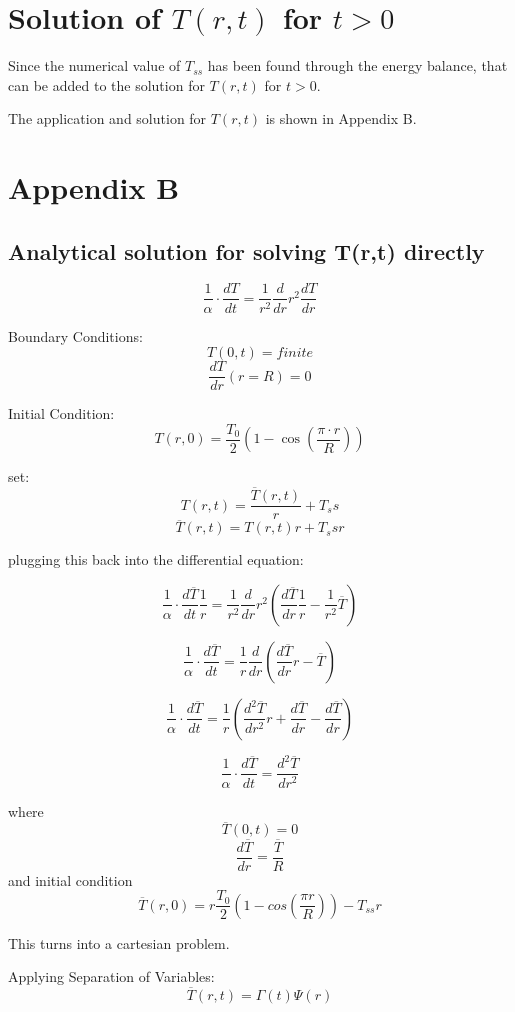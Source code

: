 \documentclass[12pt,letterpaper]{article}
\begin{document}
{\section*{Solution of $T(r,t)$ for $t > 0$}
Since the numerical value of $T_{ss}$ has been found
through the energy balance, that can be added to the solution
for $T(r,t)$ for $t>0$.

The application and solution for $T(r,t)$ is shown in Appendix B.

\pagebreak
\section*{Appendix B}

\subsection*{Analytical solution for solving T(r,t) directly}

\[\frac{1}{\alpha} \cdot \frac{dT}{dt} = \frac{1}{r^2} \frac{d}{dr} r^2 \frac{dT}{dr}\]

Boundary Conditions:
\[T(0,t) = finite \]
\[\frac{dT}{dr} (r = R) = 0 \]

Initial Condition:
\[T(r,0) = \frac{T_0}{2} (1-\cos{(\frac{\pi \cdot r}{R})}) \]

set:
\[T(r,t) = \frac{\overline{T} (r,t)}{r} +T_ss\]
\[\overline{T} (r,t) = T(r,t) r + T_ss r\]

plugging this back into the differential equation:

\[\frac{1}{\alpha} \cdot \frac{d\overline{T}}{dt} \frac{1}{r} = \frac{1}{r^2} \frac{d}{dr} r^2 (\frac{d\overline{T}}{dr} \frac{1}{r} - \frac{1}{r^2} \overline{T}) \]

\[\frac{1}{\alpha} \cdot \frac{d\overline{T}}{dt} = \frac{1}{r} \frac{d}{dr} (\frac{d\overline{T}}{dr} r - \overline{T}) \]

\[\frac{1}{\alpha} \cdot \frac{d\overline{T}}{dt} = \frac{1}{r} (\frac{d^2\overline{T}}{dr^2} r + \frac{d\overline{T}}{dr} - \frac{d\overline{T}}{dr}) \]

\[\frac{1}{\alpha} \cdot \frac{d\overline{T}}{dt} = \frac{d^2\overline{T}}{dr^2} \]

where 
\[\overline{T}(0,t) = 0 \]
\[\frac{d\overline{T}}{dr} = \frac{\overline{T}}{R}\]
and initial condition
\[\overline{T} (r,0) = r \frac{T_0}{2} (1- cos(\frac{\pi r}{R})) - T_{ss} r\]

This turns into a cartesian problem.

Applying Separation of Variables:
\[\overline{T}(r,t) = \Gamma (t) \Psi (r)  \]

}
\end{document}
